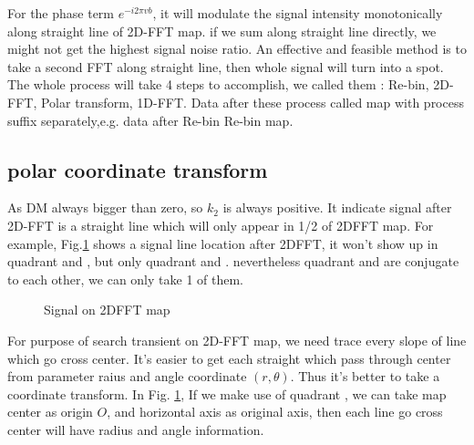 \documentclass[twocolumn]{aastex61}
\begin{document}
For the phase term $e^{-i2\pi vb}$, it will modulate the signal intensity monotonically along straight line of 2D-FFT map. if we sum along straight line directly, we might not get the highest signal noise ratio. An effective and feasible method is to take a second FFT along straight line, then whole signal will turn into a spot. The whole process will take 4 steps to accomplish, we called them : Re-bin, 2D-FFT, Polar transform, 1D-FFT. Data after these process called map with process suffix separately,e.g. data after Re-bin  Re-bin map.

\subsection{polar coordinate transform}\label{sec:polar coordinate transform}

As DM always bigger than zero, so $k_2$ is always positive. It indicate signal after 2D-FFT is a straight line which will only appear in 1/2 of 2DFFT map. For example, Fig.\ref{fig:2DFFT} shows a signal line location after 2DFFT, it won't show up in quadrant \uppercase\expandafter{} and  \uppercase\expandafter{}, but only quadrant \uppercase\expandafter{} and \uppercase\expandafter{}. nevertheless quadrant \uppercase\expandafter{} and \uppercase\expandafter{} are conjugate to each other, we can only take 1 of them.

\begin{figure}[ht!]
\caption{Signal on 2DFFT map \label{fig:2DFFT}}
\end{figure}

For purpose of search transient on 2D-FFT map, we need trace every slope of line which go cross center. It's easier to get each straight which pass through center from parameter raius and angle  coordinate $(r,\theta)$. Thus it's better to take a coordinate transform.  In Fig. \ref{fig:2DFFT},  If we make use of quadrant \uppercase\expandafter{}, we can take map center as origin $O$, and horizontal axis as original axis, then each line go cross center will have radius and angle information. 

\end{document}
